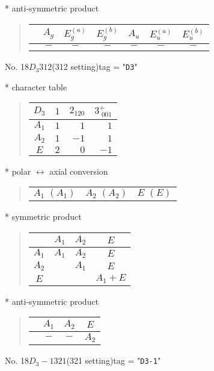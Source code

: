 \documentclass[fleqn,10pt,landscape]{jsarticle}
\begin{document}
* anti-symmetric product
\begin{quote}
\begin{tabular}{ccccccc} \hline \hline
 & $ A_{g} $ & $ E_{g}^{(a)} $ & $ E_{g}^{(b)} $ & $ A_{u} $ & $ E_{u}^{(a)} $ & $ E_{u}^{(b)} $ \\ \hline
$  $ & $ - $ & $ - $ & $ - $ & $ - $ & $ - $ & $ - $ \\
 \hline \hline
\end{tabular}
\end{quote}
\newpage
No. 18\quad$D_{3}$\quad$312$\quad(312 setting)\quad[ trigonal ]
tag = "{\tt D3}"

* character table
\begin{quote}
\begin{tabular}{crrr} \hline \hline
$ D_{3} $ & $ 1 $ & $ 2{}_{120} $ & $ 3^{+}_{\,\,001} $ \\ \hline
$ A_{1} $ & $ 1 $ & $ 1 $ & $ 1 $ \\
$ A_{2} $ & $ 1 $ & $ -1 $ & $ 1 $ \\
$ E $ & $ 2 $ & $ 0 $ & $ -1 $ \\
 \hline \hline
\end{tabular}
\end{quote}
* polar $\leftrightarrow$ axial conversion
\begin{quote}
\begin{tabular}{ccc}
$ A_{1}\,\,(A_{1}) $ & $ A_{2}\,\,(A_{2}) $ & $ E\,\,(E) $
\end{tabular}
\end{quote}
* symmetric product
\begin{quote}
\begin{tabular}{c|ccc} \hline \hline
 & $ A_{1} $ & $ A_{2} $ & $ E $ \\ \hline
$ A_{1} $ & $ A_{1} $ & $ A_{2} $ & $ E $ \\
$ A_{2} $ & $  $ & $ A_{1} $ & $ E $ \\
$ E $ & $  $ & $  $ & $ A_{1} + E $ \\
 \hline \hline
\end{tabular}
\end{quote}
* anti-symmetric product
\begin{quote}
\begin{tabular}{cccc} \hline \hline
 & $ A_{1} $ & $ A_{2} $ & $ E $ \\ \hline
$  $ & $ - $ & $ - $ & $ A_{2} $ \\
 \hline \hline
\end{tabular}
\end{quote}
\newpage
No. 18\quad$D_{3}-1$\quad$321$\quad(321 setting)\quad[ trigonal ]
tag = "{\tt D3-1}"
\end{document}
